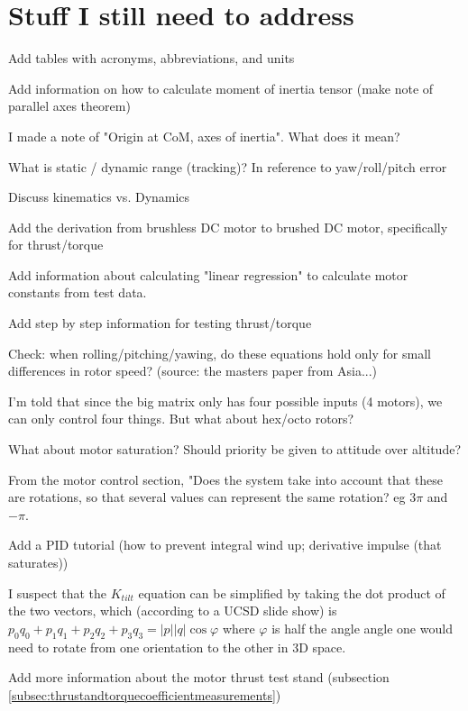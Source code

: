 \documentclass{article}
\numberwithin{equation}{section} %
\begin{document}
\section{Stuff I still need to address}
\begin{list}{*}{}
	\item Add tables with acronyms, abbreviations, and units
	\item Add information on how to calculate moment of inertia tensor (make note of parallel axes theorem)
	\item I made a note of "Origin at CoM, axes of inertia". What does it mean?
	\item What is static / dynamic range (tracking)? In reference to yaw/roll/pitch error
	\item Discuss kinematics vs. Dynamics
	\item Add the derivation from brushless DC motor to brushed DC motor, specifically for thrust/torque
	\item Add information about calculating "linear regression" to calculate motor constants from test data.
	\item Add step by step information for testing thrust/torque
	\item Check: when rolling/pitching/yawing, do these equations hold only for small differences in rotor speed? (source: the masters paper from Asia...)
	\item I'm told that since the big matrix only has four possible inputs (4 motors), we can only control four things. But what about hex/octo rotors?
	\item What about motor saturation? Should priority be given to attitude over altitude?
	\item From the motor control section, "Does the system take into account that these are rotations, so that several values can represent the same rotation? eg $3\pi$ and $-\pi$.
	\item Add a PID tutorial (how to prevent integral wind up; derivative impulse (that saturates))
	\item I suspect that the $K_{tilt}$ equation can be simplified by taking the dot product of the two vectors, which (according to a UCSD slide show) is $p_0 q_0 +p_1 q_1 + p_2 q_2 + p_3 q_3 = |p||q| \cos \varphi$ where $\varphi$ is half the angle angle one would need to rotate from one orientation to the other in 3D space.
	\item Add more information about the motor thrust test stand (subsection \ref{subsec:thrustandtorquecoefficientmeasurements})
	\item 
	
\end{list}
\end{document}
